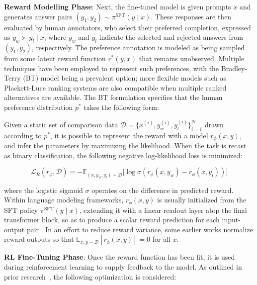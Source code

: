 \textbf{Reward Modelling Phase}: Next, the fine-tuned model is given prompts $x$ and generates answer pairs $(y_1, y_2)\sim \pi^\text{SFT}(y \mid x)$. These responses are then evaluated by human annotators, who select their preferred completion, expressed as $y_w\succ y_l \mid x$, where $y_w$ and $y_l$ indicate the selected and rejected answers from $(y_1, y_2)$, respectively. The preference annotation is modeled as being sampled from some latent reward function $r^*(y, x)$ that remains unobserved. Multiple techniques have been employed to represent such preferences, with the Bradley-Terry (BT) model \cite{bradley1952rankanalysis} being a prevalent option; more flexible models such as Plackett-Luce ranking systems \citep{plackett1975analysis, luce2012individual} are also compatible when multiple ranked alternatives are available. The BT formulation specifies that the human preference distribution $p^*$ takes the following form:

Given a static set of comparison data $\mathcal{D}=\bigl\{x^{(i)}, y_w^{(i)}, y_l^{(i)}\bigr\}_{i=1}^N$ drawn according to $p^*$, it is possible to represent the reward with a model $r_{\phi}(x, y)$, and infer the parameters by maximizing the likelihood. When the task is recast as binary classification, the following negative log-likelihood loss is minimized:

\begin{equation}\label{eq:reward_model}
    \mathcal{L}_R(r_{\phi}, \mathcal{D}) = -\mathbb{E}_{(x, y_w, y_l)\sim \mathcal{D}}\bigl[\log \sigma(r_{\phi}(x, y_w)- r_{\phi}(x, y_l))\bigr]
\end{equation}

where the logistic sigmoid $\sigma$ operates on the difference in predicted reward. Within language modeling frameworks, $r_{\phi}(x, y)$ is usually initialized from the SFT policy $\pi^\text{SFT}(y \mid x)$, extending it with a linear readout layer atop the final transformer block, so as to produce a scalar reward prediction for each input-output pair \cite{ziegler2020finetuning}. In an effort to reduce reward variance, some earlier works normalize reward outputs so that $\mathbb{E}_{x,y\sim \mathcal{D}}\left[r_\phi(x, y)\right] = 0$ for all $x$.

\textbf{RL Fine-Tuning Phase}: Once the reward function has been fit, it is used during reinforcement learning to supply feedback to the model. As outlined in prior research~\citep{jaques2017sequence, jaques2020human}, the following optimization is considered:

